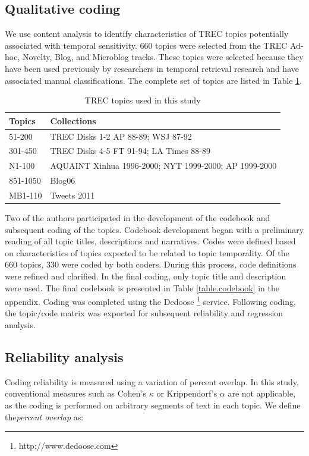 \documentclass{sig-alternate}
\begin{document}
\subsection{Qualitative coding}
We use content analysis \cite{Krippendorf1980} to identify characteristics of TREC topics potentially associated with temporal sensitivity. 660 topics were selected from the TREC Ad-hoc, Novelty, Blog, and Microblog tracks. These topics were selected because they have been used previously by researchers in temporal retrieval research and have associated manual classifications.  The complete set of topics are listed in Table \ref{table.topics}.

\begin{table}
\small
\begin{tabular}{| l |  p{6cm} |} \hline
\bf{Topics} & \bf{Collections}  \\ \hline
51-200 & TREC Disks 1-2 AP 88-89; WSJ 87-92 \\ \hline
301-450 &  TREC Disks 4-5 FT 91-94; LA Times 88-89 \\ \hline
N1-100 & AQUAINT Xinhua 1996-2000; NYT 1999-2000; AP 1999-2000 \\ \hline
851-1050 & Blog06  \\ \hline
MB1-110 & Tweets 2011 \\ \hline
\end{tabular}
\caption{TREC topics used in this study}
\label{table.topics}
\end{table}

Two of the authors participated in the development of the codebook and subsequent coding of the topics.  Codebook development began with a preliminary reading of all topic titles, descriptions and narratives. Codes were defined based on characteristics of topics expected to be related to topic temporality.  Of the 660 topics, 330 were coded by both coders. During this process, code definitions were refined and clarified. In the final coding, only topic title and description were used. The final codebook is presented in Table \ref{table.codebook} in the appendix.  Coding was completed using the Dedoose \footnote{http://www.dedoose.com} service.  Following coding, the topic/code matrix was exported for subsequent reliability and regression analysis.

\subsection{Reliability analysis}
Coding reliability is measured using a variation of percent overlap.  In this study, conventional measures such as Cohen's $\kappa$ or Krippendorf's $\alpha$ are not applicable, as the coding is performed on arbitrary segments of text in each topic.  We define the\emph{percent overlap} as:
\end{document}
